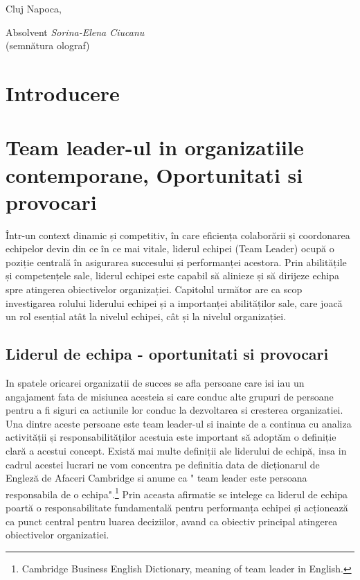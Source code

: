 \documentclass[a4paper, 12pt]{article}
\begin{document}
\vspace{3 cm}
\begin{flushleft}
	\large Cluj Napoca,
\end{flushleft}


\begin{flushright}
	\hfill \large Absolvent \textit{Sorina-Elena Ciucanu} \\
	\hfill \large {(semnătura olograf)}
\end{flushright}
\newpage
\thispagestyle{empty}
\tableofcontents
\thispagestyle{empty}
\newpage
\thispagestyle{empty}
\listoffigures
\newpage
\thispagestyle{empty}
\listoftables


\newpage



	\section*{Introducere}

\newpage
	\setcounter{section}{0}
	\section{Team leader-ul in organizatiile contemporane, Oportunitati si provocari}
\quad \quad\space Într-un context dinamic și competitiv, în care eficiența colaborării și coordonarea echipelor devin din ce în ce mai vitale, liderul echipei (Team Leader) ocupă o poziție centrală în asigurarea succesului și performanței acestora. Prin abilitățile și competențele sale, liderul echipei este capabil să alinieze și să dirijeze echipa spre atingerea obiectivelor organizației. Capitolul următor are ca scop investigarea rolului liderului echipei și a importanței abilităților sale, care joacă un rol esențial atât la nivelul echipei, cât și la nivelul organizației.
		\subsection{ Liderul de echipa - oportunitati si provocari}

\quad\quad\space In spatele oricarei organizatii de succes se afla persoane care isi iau un angajament fata de misiunea acesteia si care conduc alte grupuri de persoane pentru a fi siguri ca actiunile lor conduc la dezvoltarea si cresterea organizatiei. Una dintre aceste persoane este team leader-ul si inainte de a continua cu analiza activității și responsabilităților acestuia este important să adoptăm o definiție clară a acestui concept. Există mai multe definiții ale liderului de echipă, insa in cadrul acestei lucrari ne vom concentra pe definitia data de dicționarul de Engleză de Afaceri Cambridge si anume ca " team leader este persoana responsabila de o echipa".\footnote{Cambridge Business English Dictionary, meaning of team leader in English.} Prin aceasta afirmatie se intelege ca liderul de echipa poartă o responsabilitate fundamentală pentru performanța echipei și acționează ca punct central pentru luarea deciziilor, avand ca obiectiv principal atingerea obiectivelor organizatiei.
\end{document}
